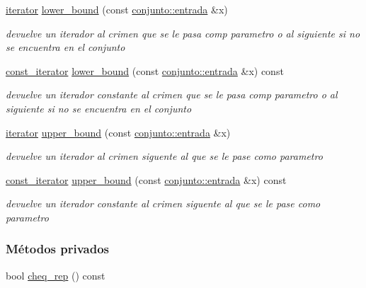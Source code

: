 \begin{DoxyCompactItemize}
\hyperlink{classconjunto_1_1iterator}{iterator} \hyperlink{classconjunto_ac830a38ca19dbacce59ff5164c64803d}{lower\-\_\-bound} (const \hyperlink{classconjunto_a7630ace7cb17bcec07daf5804f1a0780}{conjunto\-::entrada} \&x)
\begin{DoxyCompactList}\small\item\em devuelve un iterador al crimen que se le pasa comp parametro o al siguiente si no se encuentra en el conjunto \end{DoxyCompactList}\item 
\hyperlink{classconjunto_1_1const__iterator}{const\-\_\-iterator} \hyperlink{classconjunto_ae109bd728bf47742fc789f1fd99d602b}{lower\-\_\-bound} (const \hyperlink{classconjunto_a7630ace7cb17bcec07daf5804f1a0780}{conjunto\-::entrada} \&x) const 
\begin{DoxyCompactList}\small\item\em devuelve un iterador constante al crimen que se le pasa comp parametro o al siguiente si no se encuentra en el conjunto \end{DoxyCompactList}\item 
\hyperlink{classconjunto_1_1iterator}{iterator} \hyperlink{classconjunto_ac74ec1a3afc44d25dae5b601eac31a70}{upper\-\_\-bound} (const \hyperlink{classconjunto_a7630ace7cb17bcec07daf5804f1a0780}{conjunto\-::entrada} \&x)
\begin{DoxyCompactList}\small\item\em devuelve un iterador al crimen siguente al que se le pase como parametro \end{DoxyCompactList}\item 
\hyperlink{classconjunto_1_1const__iterator}{const\-\_\-iterator} \hyperlink{classconjunto_a5d47cfd4bdab2cce418c59d790719b1b}{upper\-\_\-bound} (const \hyperlink{classconjunto_a7630ace7cb17bcec07daf5804f1a0780}{conjunto\-::entrada} \&x) const 
\begin{DoxyCompactList}\small\item\em devuelve un iterador constante al crimen siguente al que se le pase como parametro \end{DoxyCompactList}\end{DoxyCompactItemize}
\subsubsection*{Métodos privados}
\begin{DoxyCompactItemize}
\item 
bool \hyperlink{classconjunto_a29289cb22c2a18055e93ae543f6a6845}{cheq\-\_\-rep} () const 
\end{DoxyCompactItemize}
